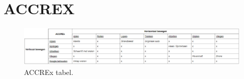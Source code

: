 \chapter{ACCREX}
\label{cha:bijlage_E}

\begin{figure}[H]
    \centering
    \includegraphics[width = 180mm, angle=270]{06_bijlage_E/ACCREx_tabel_g.PNG}
    \caption{ACCREx tabel.}
    \label{fig:Accrex_tabel}
\end{figure}